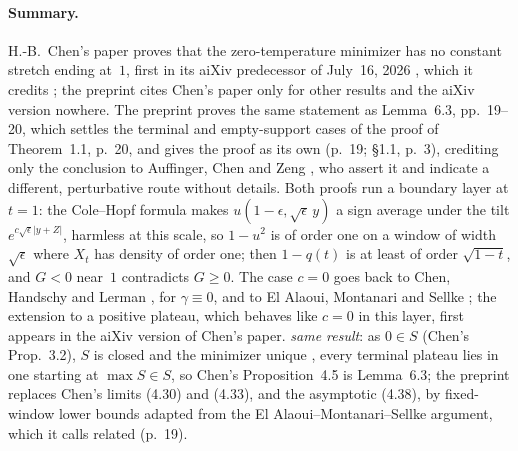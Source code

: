 \documentclass[11pt]{article}
\newcommand{\ploc}[2]{#1}
\newcommand{\sloc}[2]{\cite[#2]{#1}}
\newcommand{\rel}[1]{\textit{#1}}
\begin{document}
\paragraph{Summary.}
H.-B.~Chen's paper \sloc{Chen2026-FRSBFullIntervalSupportZeroTemp}{Prop.~4.5,
pp.~23--25} proves that the zero-temperature minimizer has no constant stretch
ending at~$1$, first in its aiXiv predecessor of July~16, 2026
\sloc{ChatGPT2026-FRSBFullIntervalSupportZeroTemp}{Prop.~4.4, pp.~32--33},
which it credits
\sloc{Chen2026-FRSBFullIntervalSupportZeroTemp}{p.~1; App.~C, p.~38}; the
preprint cites Chen's paper only for other results and the aiXiv version
nowhere.
The preprint proves the same statement as \ploc{Lemma~6.3,
pp.~19--20}{variation.tex:130--213}, which settles the terminal and
empty-support cases of the \ploc{proof of Theorem~1.1,
p.~20}{variation.tex:215--221}, and gives the proof as its own
(\ploc{p.~19}{variation.tex:137--139}; \ploc{\S1.1, p.~3}{main.tex:183--185}),
crediting only the conclusion to Auffinger, Chen and Zeng
\sloc{AuffingerEtAl2017-SKInfiniteStepRSBZeroTemp}{Remark~7, p.~15}, who
assert it and indicate a different, perturbative route without details.
Both proofs run a boundary layer at $t=1$: the Cole--Hopf formula makes
$u(1-\epsilon,\sqrt\epsilon\,y)$ a sign average under the tilt
$e^{c\sqrt\epsilon|y+Z|}$, harmless at this scale, so $1-u^2$ is of order one
on a window of width $\sqrt\epsilon$ where $X_t$ has density of order one;
then $1-q(t)$ is at least of order $\sqrt{1-t}$, and $G<0$ near~$1$
contradicts $G\ge0$.
The case $c=0$ goes back to Chen, Handschy and Lerman
\sloc{ChenEtAl2016-EnergyLandscapeMixedEvenPSpin}{proof of Thm.~6,
pp.~14--16}, for $\gamma\equiv0$, and to El Alaoui, Montanari and Sellke
\cite{ElAlaouiEtAl2020-OptimizationMeanFieldSpinGlasses}; the extension to a
positive plateau, which behaves like $c=0$ in this layer, first appears in
the aiXiv version of Chen's paper.
\rel{same result}: as $0\in S$ (Chen's Prop.~3.2), $S$ is closed and the
minimizer unique \sloc{ChenEtAl2016-EnergyLandscapeMixedEvenPSpin}{Thm.~4,
p.~8}, every terminal plateau lies in one starting at $\max S\in S$, so
Chen's Proposition~4.5 is Lemma~6.3; the preprint replaces Chen's limits
(4.30) and (4.33), and the asymptotic (4.38), by fixed-window lower bounds
adapted from the El Alaoui--Montanari--Sellke argument, which it calls
related (\ploc{p.~19}{variation.tex:140--143}).
\end{document}
